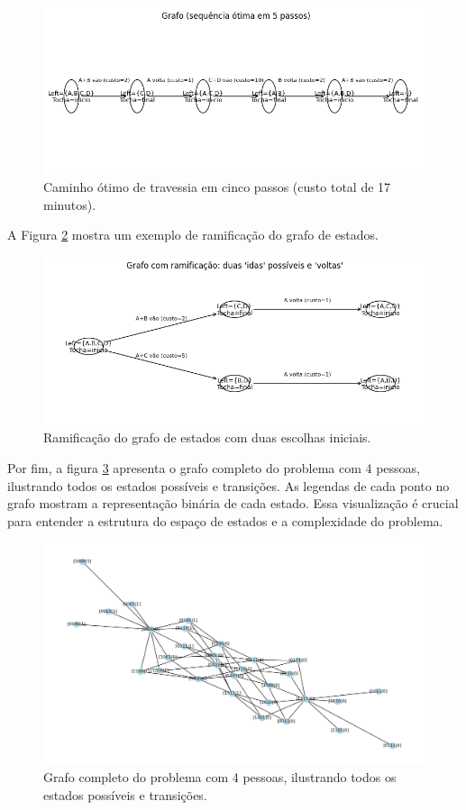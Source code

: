 \documentclass[12pt,a4paper]{article}
\begin{document}
\begin{figure}[H]
    \centering
    \includegraphics[width=0.8\linewidth]{optimal_path.png}
    \caption{Caminho ótimo de travessia em cinco passos (custo total de 17 minutos).}
    \label{fig:optimal_path}
\end{figure}

A Figura \ref{fig:ramification} mostra um exemplo de ramificação do grafo de estados.

\begin{figure}[H]
    \centering
    \includegraphics[width=0.8\linewidth]{ramification.png}
    \caption{Ramificação do grafo de estados com duas escolhas iniciais.}
    \label{fig:ramification}
\end{figure}

Por fim, a figura \ref{fig:full_graph} apresenta o grafo completo do problema com 4 pessoas, ilustrando todos os estados possíveis e transições. As legendas de cada ponto no grafo mostram a representação binária de cada estado. Essa visualização é crucial para entender a estrutura do espaço de estados e a complexidade do problema.

\begin{figure}[H]
    \centering
    \includegraphics[width=0.8\linewidth]{graph_complete_labels.png}
    \caption{Grafo completo do problema com 4 pessoas, ilustrando todos os estados possíveis e transições.}
    \label{fig:full_graph}
\end{figure}
\end{document}
